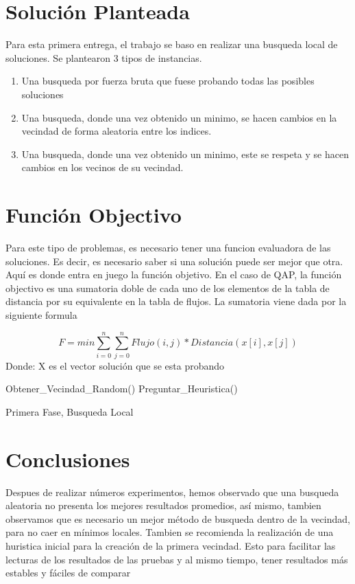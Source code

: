 \documentclass{ci5652}
\begin{document}
\section{Solución Planteada }
Para esta primera entrega, el trabajo se baso en realizar una busqueda local de soluciones. Se plantearon 3 tipos de instancias.
\begin{enumerate}
\item Una busqueda por fuerza bruta que fuese probando todas las posibles soluciones
\item Una busqueda, donde una vez obtenido un minimo, se hacen cambios en la vecindad de forma aleatoria entre los indices.
\item Una busqueda, donde una vez obtenido un minimo, este se respeta y se hacen cambios en los vecinos de su vecindad.
\end{enumerate}
\section{Función Objectivo}
\vspace*{0.2cm} Para este tipo de problemas, es necesario tener una funcion evaluadora de las soluciones. Es decir, es necesario saber si una solución puede ser mejor que otra. Aquí es donde entra en juego la función objetivo. En el caso de QAP, la función objectivo es una sumatoria doble de cada uno de los elementos de la tabla de distancia por su equivalente en la tabla de flujos.
La sumatoria viene dada por la siguiente formula


\[F =  min \sum_{i=0}^{n} \sum_{j=0}^{n}  Flujo(i,j) * Distancia(x[i],x[j]) \]
Donde:
X es el vector solución que se esta probando

\begin{algorithm}
 \DontPrintSemicolon
 \vspace*{0.1cm}
 Obtener\_Vecindad\_Random()\;
 Preguntar\_Heuristica()\;
 
 \vspace*{0.1cm}
 \caption{Primera Fase, Busqueda Local}
\end{algorithm}


\section{Conclusiones}
Despues de realizar números experimentos, hemos observado que una busqueda aleatoria no presenta los mejores resultados promedios, así mismo, tambien observamos que es necesario un mejor método de busqueda dentro de la vecindad, para no caer en mínimos locales. Tambien se recomienda la realización de una huristica inicial para la creación de la primera vecindad. Esto para facilitar las lecturas de los resultados de las pruebas y al mismo tiempo, tener resultados más estables y fáciles de comparar
\end{document}
